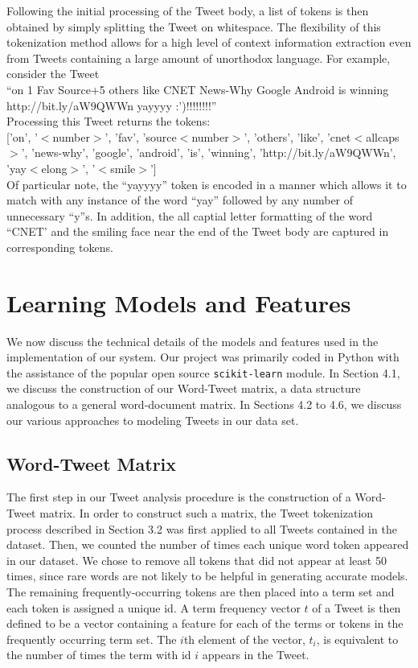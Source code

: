 \documentclass[11pt]{article}
\begin{document}
Following the initial processing of the Tweet body, a list of tokens is then obtained by simply splitting the Tweet on whitespace. The flexibility of this tokenization method allows for a high level of context information extraction even from Tweets containing a large amount of unorthodox language. For example, consider the Tweet \\

``on 1 Fav Source+5 others like CNET News-Why Google Android is winning http://bit.ly/aW9QWWn yayyyy :')!!!!!!!!'' \\

Processing this Tweet returns the tokens: \\

['on', '$<$number$>$', 'fav', 'source$<$number$>$', 'others', 'like', 'cnet$<$allcaps$>$', 'news-why', 'google', 'android', 'is', 'winning', 'http://bit.ly/aW9QWWn', 'yay$<$elong$>$', '$<$smile$>$'] \\

Of particular note, the ``yayyyy'' token is encoded in a manner which allows it to match with any instance of the word ``yay'' followed by any number of unnecessary ``y''s. In addition, the all captial letter formatting of the word ``CNET' and the smiling face near the end of the Tweet body are captured in corresponding tokens.

\section{Learning Models and Features}

We now discuss the technical details of the models and features used in the implementation of our system. Our project was primarily coded in Python with the assistance of the popular open source \texttt{scikit-learn} module. In Section 4.1, we discuss the construction of our Word-Tweet matrix, a data structure analogous to a general word-document matrix. In Sections 4.2 to 4.6, we discuss our various approaches to modeling Tweets in our data set.

\subsection{Word-Tweet Matrix}

The first step in our Tweet analysis procedure is the construction of a Word-Tweet matrix. In order to construct such a matrix, the Tweet tokenization process described in Section 3.2 was first applied to all Tweets contained in the dataset. Then, we counted the number of times each unique word token appeared in our dataset. We chose to remove all tokens that did not appear at least 50 times, since rare words are not likely to be helpful in generating accurate models. The remaining frequently-occurring tokens are then placed into a term set and each token is assigned a unique id. A term frequency vector $t$ of a Tweet is then defined to be a vector containing a feature for each of the terms or tokens in the frequently occurring term set. The $i$th element of the vector, $t_i$, is equivalent to the number of times the term with id $i$ appears in the Tweet.
\end{document}
